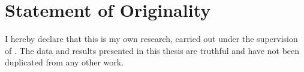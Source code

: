 \chapter*{Statement of Originality}
\label{commitment}

I hereby declare that this is my own research, carried out under the supervision of \tenGVHD. The data and results presented in this thesis are truthful and have not been duplicated from any other work.
